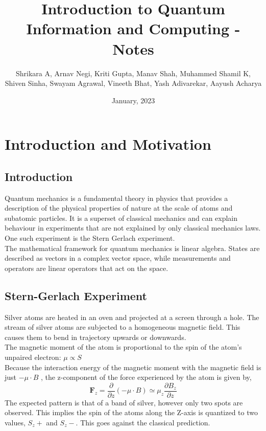 \documentclass{article}
\title{Introduction to Quantum Information and Computing - Notes}
\author{Shrikara A, Arnav Negi, Kriti Gupta, Manav Shah, Muhammed Shamil K,\\ Shiven Sinha, Swayam Agrawal, Vineeth Bhat, Yash Adivarekar, Aayush Acharya} %
\date{January, 2023}
\begin{document}
\maketitle
\vfill
\tableofcontents
\newpage
{}


\section{Introduction and Motivation}
\subsection{Introduction}

Quantum mechanics is a fundamental theory in physics that provides a description of the physical properties of nature at the scale of atoms and subatomic particles. It is a superset of classical mechanics and can explain
behaviour in experiments that are not explained by only classical mechanics laws. One such experiment is
the Stern Gerlach experiment.\\

The mathematical framework for quantum mechanics is linear algebra. States are described as vectors in a complex
vector space, while measurements and operators are linear operators that act on the space.\\


\subsection{Stern-Gerlach Experiment}

Silver atoms are heated in an oven and projected at a screen through a hole. The stream of silver atoms
are subjected to a homogeneous magnetic field. This causes them to bend in trajectory upwards or downwards.\\

The magnetic moment of the atom is proportional to the spin of the atom's unpaired electron: $\mu \propto S$\\

Because the interaction energy of the magnetic moment with the magnetic field
is just $-\mu \cdot B$ , the z-component of the force experienced by the atom is given by,
$$\textbf{F}_z = \frac{\partial}{\partial z}(-\mu \cdot B) \simeq \mu_z\frac{\partial B_z}{\partial z}$$
The expected pattern is that of a band of silver, however only two spots are observed. This implies
the spin of the atoms along the Z-axis is quantized to two values, $S_z+$ and $S_z-$. This goes against the classical prediction.
\end{document}
